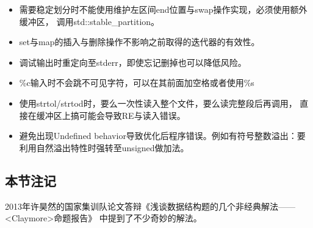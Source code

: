 \begin{itemize}
	\item 需要稳定划分时不能使用维护左区间end位置与swap操作实现，必须使用额外缓冲区，
	调用std::stable\_partition。
	\item set与map的插入与删除操作不影响之前取得的迭代器的有效性。
	\item 调试输出时重定向至stderr，即使忘记删掉也可以降低风险。
	\item \%c输入时不会跳不可见字符，可以在其前面加空格或者使用\%s
	\item 使用strtol/strtod时，要么一次性读入整个文件，要么读完整段后再调用，
	直接在缓冲区上搞可能会导致RE与读入错误。
	\item 避免出现Undefined behavior导致优化后程序错误。例如有符号整数溢出：要
	利用自然溢出特性时强转至unsigned做加法。
\end{itemize}
\subsection{本节注记}
2013年许昊然的国家集训队论文答辩《浅谈数据结构题的几个非经典解法——<Claymore>命题报告》
中提到了不少奇妙的解法。
